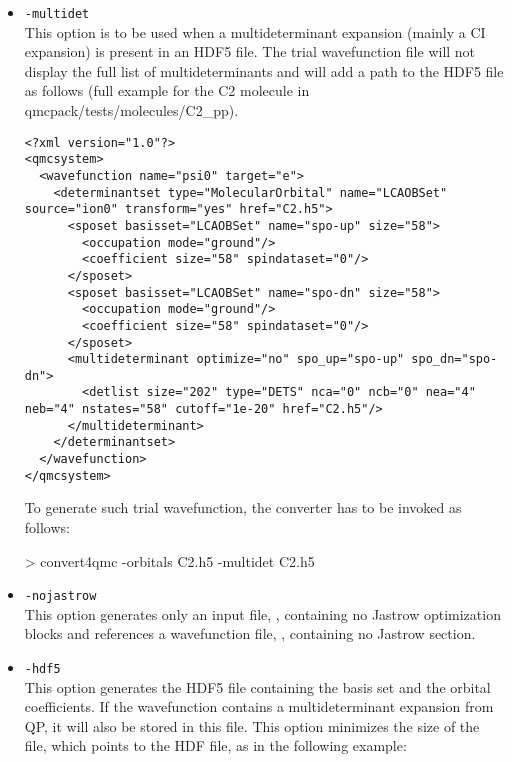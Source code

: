 \begin{itemize}
\item \texttt{-multidet}\\
This option is to be used when a multideterminant expansion (mainly a CI expansion) is present in an HDF5 file. The trial wavefunction file will not display the full list of multideterminants and will add a path to the HDF5 file as follows (full example for the C2 molecule in qmcpack/tests/molecules/C2\_pp).\\
  
\begin{lstlisting}[style=QMCPXML]
<?xml version="1.0"?>
<qmcsystem>
  <wavefunction name="psi0" target="e">
    <determinantset type="MolecularOrbital" name="LCAOBSet" source="ion0" transform="yes" href="C2.h5">
      <sposet basisset="LCAOBSet" name="spo-up" size="58">
        <occupation mode="ground"/>
        <coefficient size="58" spindataset="0"/>
      </sposet>
      <sposet basisset="LCAOBSet" name="spo-dn" size="58">
        <occupation mode="ground"/>
        <coefficient size="58" spindataset="0"/>
      </sposet>
      <multideterminant optimize="no" spo_up="spo-up" spo_dn="spo-dn">
        <detlist size="202" type="DETS" nca="0" ncb="0" nea="4" neb="4" nstates="58" cutoff="1e-20" href="C2.h5"/>
      </multideterminant>
    </determinantset>
  </wavefunction>
</qmcsystem>
\end{lstlisting}



To generate such trial wavefunction, the converter has to be invoked as follows:

\begin{shade}
> convert4qmc -orbitals C2.h5 -multidet C2.h5 
\end{shade}


\item \texttt{-nojastrow}\\
This option generates only an input file, , containing no Jastrow optimization blocks and references a wavefunction file, , containing no Jastrow section.

\item \texttt{-hdf5}\\
This option generates the  HDF5 file containing the basis set and the orbital coefficients. If the wavefunction contains a multideterminant expansion from QP, it will also be stored in this file. This option minimizes the size of the  file, which points to the HDF file, as in the following example: 


\end{itemize}
